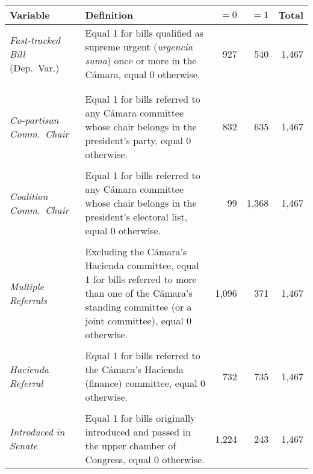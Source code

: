 \documentclass[letter,12pt]{article}
\begin{document}
\begin{footnotesize}
\singlespacing
\begin{tabularx}{\textwidth}{lXrrr} %
 Variable                      & Definition &   $=0$ &  $=1$ & Total \\ [.5ex] \hline
\emph{Fast-tracked Bill} (Dep.~Var.) & Equal 1 for bills qualified as supreme urgent (\emph{urgencia suma}) once or more in the Cámara, equal 0 otherwise.          &    927  &   540 & 1,467 \\ [.5ex] %
\\ [-1ex]
\\ [-1ex]
\emph{Co-partisan Comm.~Chair}       & Equal 1 for bills referred to any Cámara committee whose chair belongs in the president's party, equal 0 otherwise.          &    832 &   635 & 1,467 \\ [.5ex] %
\\ [-1ex]
\emph{Coalition Comm.~Chair}         & Equal 1 for bills referred to any Cámara committee whose chair belongs in the president's electoral list, equal 0 otherwise. &     99 & 1,368 & 1,467 \\ [.5ex] %
\\ [-1ex]
\emph{Multiple Referrals}            & Excluding the Cámara's Hacienda committee, equal 1 for bills referred to more than one of the Cámara's standing committee (or a joint committee), equal 0 otherwise. &  1,096 &   371 & 1,467 \\ [.5ex] %
\\ [-1ex]
\emph{Hacienda Referral}             & Equal 1 for bills referred to the Cámara's Hacienda (finance) committee, equal 0 otherwise.                                  &    732 &   735 & 1,467 \\ [.5ex] %
\\ [-1ex]
\emph{Introduced in Senate}          & Equal 1 for bills originally introduced and passed in the upper chamber of Congress, equal 0 otherwise.                      &  1,224 &   243 & 1,467 \\ [.5ex] %

\end{tabularx}
\end{footnotesize}
\end{document}
